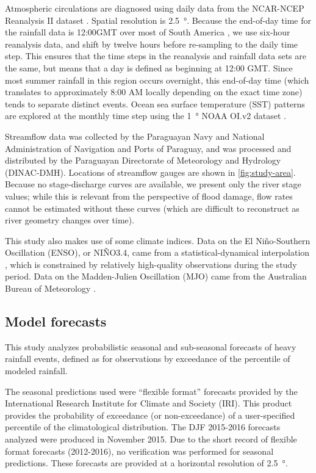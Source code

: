 \documentclass[twocol]{ametsoc}
\begin{document}
Atmospheric circulations are diagnosed using daily data from the NCAR-NCEP Reanalysis II dataset \citep{Kanamitsu:2002kk}.
Spatial resolution is \SI{2.5}{\degree}.
Because the end-of-day time for the rainfall data is 12:00GMT over most of South America \citep{xie2010cpc}, we use six-hour reanalysis data, and shift by twelve hours before re-sampling to the daily time step.
This ensures that the time steps in the reanalysis and rainfall data sets are the same, but means that a day is defined as beginning at 12:00 GMT.
Since most summer rainfall in this region occurs overnight, this end-of-day time (which translates to approximately 8:00 AM locally depending on the exact time zone) tends to separate distinct events.
Ocean sea surface temperature (SST) patterns are explored at the monthly time step using the \SI{1}{\degree} NOAA OI.v2 dataset \citep{Reynolds:2002iy}.

Streamflow data was collected by the Paraguayan Navy and National Administration of Navigation and Ports of Paraguay, and was processed and distributed by the Paraguayan Directorate of Meteorology and Hydrology (DINAC-DMH).
Locations of streamflow gauges are shown in \cref{fig:study-area}.
Because no stage-discharge curves are available, we present only the river stage values; while this is relevant from the perspective of flood damage, flow rates cannot be estimated without these curves (which are difficult to reconstruct as river geometry changes over time).

This study also makes use of some climate indices.
Data on the El Ni\~{n}o-Southern Oscillation (ENSO), or NI\~NO3.4, came from a statistical-dynamical interpolation \citep{Kaplan:1998df}, which is constrained by relatively high-quality observations during the study period.
Data on the Madden-Julien Oscillation (MJO) came from the Australian Bureau of Meteorology \citep{Wheeler:2004ea}.

\subsection{Model forecasts}

This study analyzes probabilistic seasonal and sub-seasonal forecasts of heavy rainfall events, defined as for observations by exceedance of the  percentile of modeled rainfall.

The seasonal predictions used were ``flexible format'' forecasts provided by the International Research Institute for Climate and Society (IRI).
This product provides the probability of exceedance (or non-exceedance) of a user-specified percentile of the climatological distribution.
The DJF 2015-2016 forecasts analyzed were produced in November 2015.
Due to the short record of flexible format forecasts (2012-2016), no verification was performed for seasonal predictions.
These forecasts are provided at a horizontal resolution of \SI{2.5}{\degree}.
\end{document}
